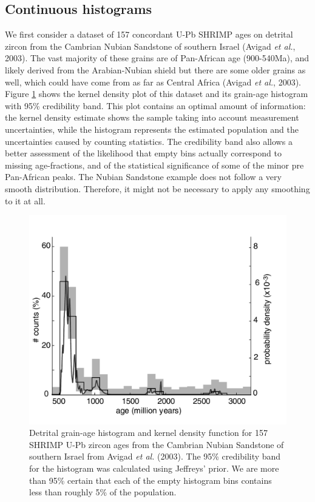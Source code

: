 \documentclass{article}
\begin{document}
\subsection{Continuous histograms} \label{sec:continuousRevisited}

We  first consider a  dataset of  157 concordant  U-Pb SHRIMP  ages on
detrital zircon from the  Cambrian Nubian Sandstone of southern Israel
(Avigad {\it et al.}, 2003). The  vast majority of these grains are of
Pan-African   age   (900-540Ma),   and   likely   derived   from   the
Arabian-Nubian shield but  there are some older grains  as well, which
could have  come from as far  as Central Africa (Avigad  {\it et al.},
2003).  Figure \ref{fig:avigad} shows  the kernel density plot of this
dataset and its grain-age  histogram with 95\% credibility band.  This
plot  contains an optimal  amount of  information: the  kernel density
estimate   shows   the   sample   taking  into   account   measurement
uncertainties, while the histogram represents the estimated population
and the uncertainties caused  by counting statistics.  The credibility
band also allows a better assessment of the likelihood that empty bins
actually correspond  to missing age-fractions, and  of the statistical
significance of some  of the minor pre Pan-African  peaks.  The Nubian
Sandstone  example  does  not   follow  a  very  smooth  distribution.
Therefore, it might  not be necessary to apply any  smoothing to it at
all.\\

\begin{figure}[here]
  \centering
  \label{fig:avigad}
  \includegraphics[width=.7\textwidth]{17_2.pdf}
  \caption{Detrital grain-age histogram and kernel density function for 
157  SHRIMP U-Pb  zircon ages  from the  Cambrian Nubian  Sandstone of
southern Israel from Avigad {\it  et al.} (2003). The 95\% credibility
band for the  histogram was calculated using Jeffreys'  prior.  We are
more than 95\% certain that  each of the empty histogram bins contains
less than roughly 5\% of the population.  }
\end{figure}
\end{document}
